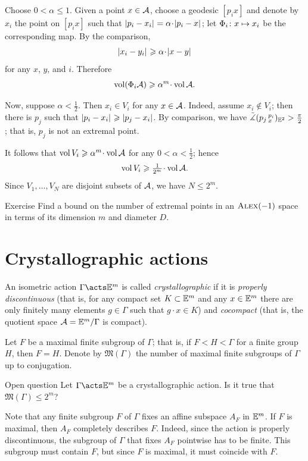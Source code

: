 Choose $0<\alpha\le 1$.
Given a point $x\in\mathcal{A}$, choose a geodesic $[p_ix]$ and denote by $x_i$ the point on $[p_ix]$ such that $\dist{p_i}{x_i}{}=\alpha\cdot\dist{p_i}{x}{}$;
let $\Phi_i\colon x\mapsto x_i$ be the corresponding map.
By the comparison, 
\[\dist{x_i}{y_i}{}\ge\alpha\cdot \dist{x}{y}{}\]
for any $x$, $y$, and $i$.
Therefore 
\[\vol(\map_i \spc{A})\ge\alpha^m\cdot\vol \spc{A}.\]

Now, suppose $\alpha<\tfrac12$.
Then $x_i\in V_i$ for any $x\in \mathcal{A}$.
Indeed, assume $x_i\notin V_i$;
then there is $p_j$ such that $\dist{p_i}{x_i}{}\ge\dist{p_j}{x_i}{}$.
By comparison, we have $\tilde\measuredangle(p_j\,{}^{p_i}_{x})_{\mathbb{E}^2}>\tfrac\pi2$;
that is, $p_j$ is not an extremal point.

It follows that $\vol V_i\ge\alpha^m\cdot\vol \spc{A}$
for any $0<\alpha<\tfrac12$; hence 
\[\vol V_i\ge\tfrac1{2^m}\cdot\vol \spc{A}.\]
Since $V_1,\dots,V_N$ are disjoint subsets of $\mathcal{A}$, we have $N\le 2^m$.
\qeds

\begin{thm}{Exercise}\label{ex:extr-point(-1)}
Find a bound on the number of extremal points in an $\textup{\textsc{Alex}}(-1)$ space in terms of its dimension $m$ and diameter $D$.
\end{thm}

\section{Crystallographic actions}

An isometric action $\Gamma\acts \EE^m$ is called \emph{crystallographic} if it is 
\emph{properly discontinuous} (that is, for any compact set $K\subset \mathbb{E}^m$ and any $x\z\in \EE^m$ there are only finitely many elements $g\in \Gamma$ such that $g\cdot x\in K$) and \emph{cocompact} (that is, the quotient space $\mathcal{A}=\mathbb{E}^m/\Gamma$ is compact).

Let $F$ be a maximal finite subgroup of $\Gamma$;
that is, if $F<H<\Gamma$ for a finite group $H$, then $F=H$.
Denote by $\mathfrak{M}(\Gamma)$ the number of maximal finite subgroups of $\Gamma$ up to conjugation.

\begin{thm}{Open question}
Let $\Gamma\acts \EE^m$ be a crystallographic action.
Is it true that $\mathfrak{M}(\Gamma)\le 2^m$?
\end{thm}

Note that any finite subgroup $F$ of $\Gamma$ fixes an affine subspace $A_F$ in $\mathbb{E}^m$.
If $F$ is maximal, then $A_F$ completely describes $F$.
Indeed, since the action is properly discontinuous, the subgroup of $\Gamma$ that fixes $A_F$ pointwise has to be finite.
This subgroup must contain $F$, but since $F$ is maximal, it must coincide with $F$.

